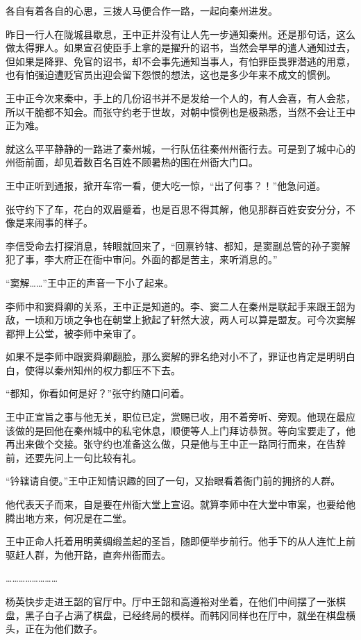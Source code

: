 各自有着各自的心思，三拨人马便合作一路，一起向秦州进发。

昨日一行人在陇城县歇息，王中正并没有让人先一步通知秦州。还是那句话，这么做太得罪人。如果宣召使臣手上拿的是擢升的诏书，当然会早早的遣人通知过去，但如果是降罪、免官的诏书，却不会事先通知当事人，有怕罪臣畏罪潜逃的用意，也有怕强迫遭贬官员出迎会留下怨恨的想法，这也是多少年来不成文的惯例。

王中正今次来秦中，手上的几份诏书并不是发给一个人的，有人会喜，有人会悲，所以干脆都不知会。而张守约老于世故，对朝中惯例也是极熟悉，当然不会让王中正为难。

就这么平平静静的一路进了秦州城，一行队伍往秦州州衙行去。可是到了城中心的州衙前面，却见着数百名百姓不顾暑热的围在州衙大门口。

王中正听到通报，掀开车帘一看，便大吃一惊，“出了何事？！”他急问道。

张守约下了车，花白的双眉蹙着，也是百思不得其解，他见那群百姓安安分分，不像是来闹事的样子。

李信受命去打探消息，转眼就回来了，“回禀钤辖、都知，是窦副总管的孙子窦解犯了事，李大府正在衙中审问。外面的都是苦主，来听消息的。”

“窦解……”王中正的声音一下小了起来。

李师中和窦舜卿的关系，王中正是知道的。李、窦二人在秦州是联起手来跟王韶为敌，一顷和万顷之争也在朝堂上掀起了轩然大波，两人可以算是盟友。可今次窦解都押上公堂，被李师中亲审了。

如果不是李师中跟窦舜卿翻脸，那么窦解的罪名绝对小不了，罪证也肯定是明明白白，使得以秦州知州的权力都压不下去。

“都知，你看如何是好？”张守约随口问着。

王中正宣旨之事与他无关，职位已定，赏赐已收，用不着旁听、旁观。他现在最应该做的是回他在秦州城中的私宅休息，顺便等人上门拜访恭贺。等向宝要走了，他再出来做个交接。张守约也准备这么做，只是他与王中正一路同行而来，在告辞前，还要先问上一句比较有礼。

“钤辖请自便。”王中正知情识趣的回了一句，又抬眼看着衙门前的拥挤的人群。

他代表天子而来，自是要在州衙大堂上宣诏。就算李师中在大堂中审案，也要给他腾出地方来，何况是在二堂。

王中正命人托着用明黄绸缎盖起的圣旨，随即便举步前行。他手下的从人连忙上前驱赶人群，为他开路，直奔州衙而去。

……………………

杨英快步走进王韶的官厅中。厅中王韶和高遵裕对坐着，在他们中间摆了一张棋盘，黑子白子占满了棋盘，已经终局的模样。而韩冈同样也在厅中，就坐在棋盘横头，正在为他们数子。

